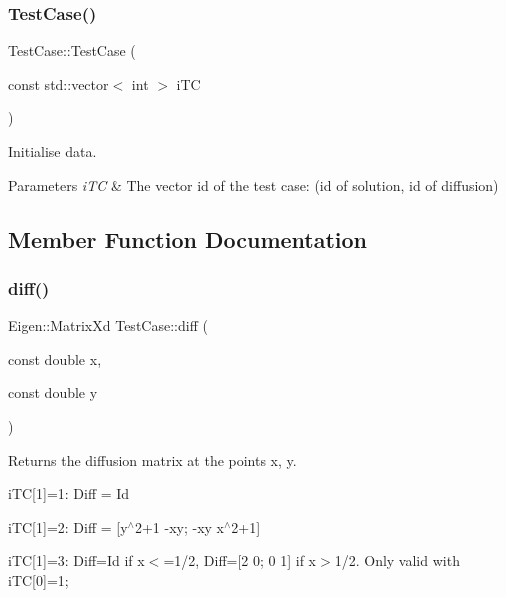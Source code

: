 \subsubsection{\texorpdfstring{Test\+Case()}{TestCase()}}
{\footnotesize\ttfamily Test\+Case\+::\+Test\+Case (\begin{DoxyParamCaption}\item[{const std\+::vector$<$ int $>$}]{i\+TC }\end{DoxyParamCaption})}



Initialise data. 


\begin{DoxyParams}{Parameters}
{\em i\+TC} & The vector id of the test case\+: (id of solution, id of diffusion) \\
\hline
\end{DoxyParams}


\subsection{Member Function Documentation}
\mbox{\label{classTestCase_a74093020578afb0e658ae1dc77011b8a}} 
\subsubsection{\texorpdfstring{diff()}{diff()}}
{\footnotesize\ttfamily Eigen\+::\+Matrix\+Xd Test\+Case\+::diff (\begin{DoxyParamCaption}\item[{const double}]{x,  }\item[{const double}]{y }\end{DoxyParamCaption})}



Returns the diffusion matrix at the points x, y. 

i\+TC\mbox{[}1\mbox{]}=1\+: Diff = Id

i\+TC\mbox{[}1\mbox{]}=2\+: Diff = \mbox{[}y$^\wedge$2+1 -\/xy; -\/xy x$^\wedge$2+1\mbox{]}

i\+TC\mbox{[}1\mbox{]}=3\+: Diff=Id if x$<$=1/2, Diff=\mbox{[}2 0; 0 1\mbox{]} if x$>$1/2. Only valid with i\+TC\mbox{[}0\mbox{]}=1; \mbox{\label{classTestCase_aede719dac81c460c713d930a379c537e}} 
